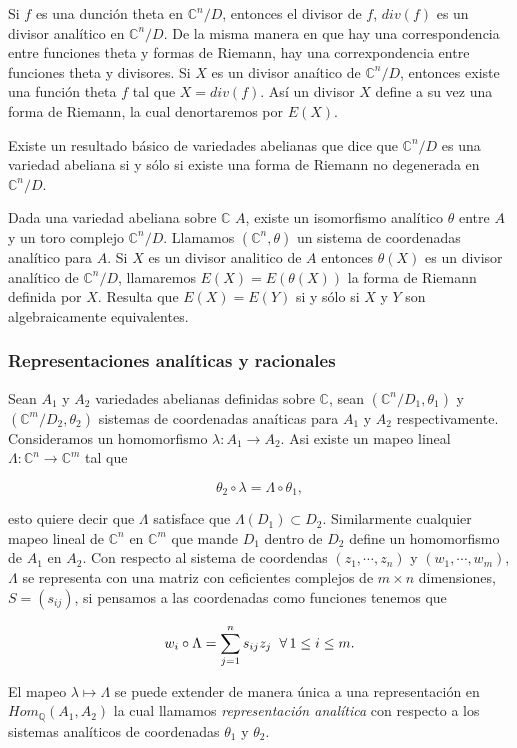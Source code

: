 \documentclass[letterpaper]{report}
\newcommand{\rac}{\ensuremath{ \mathbb Q }}
\newcommand{\co}{\ensuremath{\mathbb C }}
\begin{document}
Si $f$ es una dunción theta en $\co^n/D$, entonces el divisor de $f$, $div(f)$ es un divisor analítico en $\co^n/D$. De la misma manera en que hay una correspondencia entre funciones theta y formas de Riemann, hay una correxpondencia entre funciones theta y divisores. Si $X$ es un divisor anaítico de $\co^n/D$, entonces existe una función theta $f$ tal que $X=div(f)$. Así un divisor $X$ define a su vez una forma de Riemann, la cual denortaremos por $E(X)$.

Existe un resultado básico de variedades abelianas que dice que $\co^n/D$ es una variedad abeliana si y sólo si existe una forma de Riemann no degenerada en $\co^n/D$.

Dada una variedad abeliana sobre $\co$ $A$, existe un isomorfismo analítico $\theta$ entre $A$ y un toro complejo $\co^n/D$. Llamamos $(\co^n,\theta)$ un sistema de coordenadas analítico para $A$. Si $X$ es un divisor analitico de $A$ entonces $\theta(X)$ es un divisor analítico de $\co^n/D$, llamaremos $E(X)=E(\theta(X))$ la forma de Riemann definida por $X$. Resulta que $E(X)=E(Y)$ si y sólo si $X$ y $Y$ son algebraicamente equivalentes.

\subsubsection{Representaciones analíticas y racionales}
Sean $A_1$ y $A_2$ variedades abelianas definidas sobre $\co$, sean $(\co^n/D_1,\theta_1)$ y $(\co^m/D_2,\theta_2)$ sistemas de coordenadas anaíticas para $A_1$ y $A_2$ respectivamente. Consideramos un homomorfismo $\lambda:A_1\rightarrow A_2$. Asi existe un mapeo lineal $\Lambda:\co^n\rightarrow\co^m$ tal que 

$$\theta_2\circ\lambda=\Lambda\circ\theta_1,$$

\noindent esto quiere decir que $\Lambda$ satisface que $\Lambda(D_1)\subset D_2$. Similarmente cualquier mapeo lineal de $\co^n$ en $\co^m$ que mande $D_1$ dentro de $D_2$ define un homomorfismo de $A_1$ en $A_2$. Con respecto al sistema de coordendas $(z_1,\cdots,z_n)$ y $(w_1,\cdots,w_m)$, $\Lambda$ se representa con una matriz con ceficientes complejos  de $m\times n$ dimensiones, $S=(s_{ij})$, si pensamos a las coordenadas como funciones tenemos que

$$w_i\circ\Lambda=\sum_{j=1}^n s_{ij}z_j\hspace{0.2cm}\forall\, 1\leq i\leq m.$$

El mapeo $\lambda\mapsto\Lambda$ se puede extender de manera única a una representación en $Hom_{\rac}(A_1,A_2)$ la cual llamamos \textit{representación analítica} con respecto a los sistemas analíticos de coordenadas $\theta_1$ y $\theta_2$. 
\end{document}
